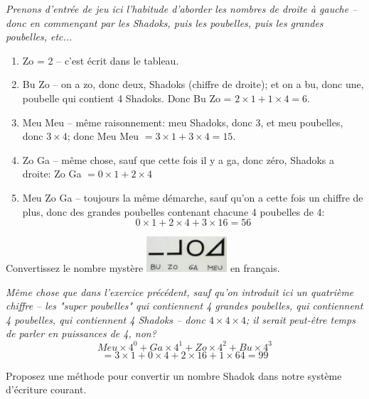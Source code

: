 \documentclass[12pt]{article}
\newenvironment{MaReponse}
		{\begin{greyedtextbox}\itshape} %
		{\end{greyedtextbox}}            %
\newenvironment{alphenum}
{\begin{enumerate}[label=\alph*.]}
	{\end{enumerate}}
\begin{document}
	\begin{MaReponse}
		Prenons d'entrée de jeu ici l'habitude d'aborder les nombres de droite à gauche -- donc en commençant par les Shadoks, puis les poubelles, puis les grandes poubelles, etc...
		\begin{alphenum}
			\item Zo = 2 -- c'est écrit dans le tableau.
			\item Bu Zo -- on a zo, donc deux, Shadoks (chiffre de droite); et on a bu, donc une, poubelle qui contient 4 Shadoks. Donc Bu Zo = $2\times1 + 1\times4 = 6$.
			\item Meu Meu -- même raisonnement: meu Shadoks, donc 3, et meu poubelles, donc $3\times4$; donc Meu Meu $= 3\times1 + 3\times4 = 15$.
			\item Zo Ga -- même chose, sauf que cette fois il y a ga, donc zéro, Shadoks a droite: Zo Ga $= 0\times1 + 2\times4$
			\item Meu Zo Ga -- toujours la même démarche, sauf qu'on a cette fois un chiffre de plus, donc des grandes poubelles contenant chacune 4 poubelles de 4:  \[ 0 \times 1 + 2 \times 4 + 3 \times 16 = 56 \]
		\end{alphenum}
	\end{MaReponse}
	
	\begin{MonExo}
		Convertissez le nombre mystère \includegraphics[width=30mm]{006_BuZoGaMeu.png} en français.
	\end{MonExo}
	
	\begin{MaReponse}
		Même chose que dans l'exercice précédent, sauf qu'on introduit ici un quatrième chiffre -- les "super poubelles" qui contiennent 4 grandes poubelles, qui contiennent 4 poubelles, qui contiennent 4 Shadoks -- donc $4\times4\times4$; il serait peut-être temps de parler en puissances de 4, non?
		\[ Meu \times 4^0 + Ga \times 4^1 + Zo \times 4^2 + Bu \times 4^3\] 
		\[= 3 \times 1 + 0 \times 4 + 2 \times 16 + 1 \times 64 = 99\]
	\end{MaReponse}
	
	\begin{MonExo}
		Proposez une méthode pour convertir un nombre Shadok dans notre système d'écriture courant.
	\end{MonExo}
	
\end{document}
